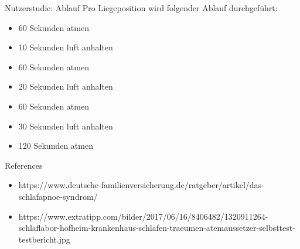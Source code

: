 \documentclass[18pt]{beamer}
\begin{document}
\begin{frame}{Nutzerstudie: Ablauf}
Pro Liegeposition wird folgender Ablauf durchgeführt:
\begin{itemize}
	\item 60 Sekunden atmen
	\item 10 Sekunden luft anhalten
	\item 60 Sekunden atmen
	\item 20 Sekunden luft anhalten
	\item 60 Sekunden atmen
	\item 30 Sekunden luft anhalten
	\item 120 Sekunden atmen
\end{itemize}
\end{frame}


\appendix
\beginbackup

\begin{frame}[allowframebreaks]{References}
\begin{itemize}
	\item https://www.deutsche-familienversicherung.de/ratgeber/artikel/das-schlafapnoe-syndrom/
	\item https://www.extratipp.com/bilder/2017/06/16/8406482/1320911264-schlaflabor-hofheim-krankenhaus-schlafen-traeumen-atemaussetzer-selbsttest-testbericht.jpg
\end{itemize}
\printbibliography
\end{frame}

\backupend
\end{document}
